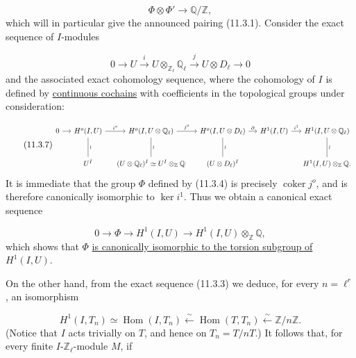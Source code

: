 \begin{equation}\tag{11.3.5}
\Phi\otimes\Phi'\longrightarrow\mathbb Q/\mathbb Z,
\end{equation}
which will in particular give the announced pairing (11.3.1). Consider
the exact sequence of $I$-modules

\begin{equation}\tag{11.3.6}
0\longrightarrow U\xrightarrow{\ i\ }
 U\otimes_{\mathbb Z_\ell}\mathbb Q_\ell
 \xrightarrow{\ j\ }U\otimes D_\ell\longrightarrow0
\end{equation}
and the associated exact cohomology sequence, where the cohomology of
$I$ is defined by \underline{continuous cochains} with coefficients in
the topological groups under consideration:

\begin{equation}\tag{11.3.7}
\resizebox{\textwidth}{!}{%
\begin{tikzcd}[ampersand replacement=\&, column sep=small, row sep=large]
0 \arrow[r]
 \& H^o(I,U) \arrow[r, "i^o"] \arrow[d, no head, "\wr"]
 \& H^o(I,U\otimes\mathbb Q_\ell) \arrow[r, "j^o"]
      \arrow[d, no head, "\wr"]
 \& H^o(I,U\otimes D_\ell) \arrow[r, "\partial"]
      \arrow[d, no head, "\wr"]
 \& H^1(I,U) \arrow[r, "i^1"]
 \& H^1(I,U\otimes\mathbb Q_\ell) \arrow[d, no head, "\wr"] \\
{}
 \& U^I
 \& (U\otimes\mathbb Q_\ell)^I\simeq U^I\otimes_{\mathbb Z}\mathbb Q
 \& (U\otimes D_\ell)^I
 \& {}
 \& H^1(I,U)\otimes_{\mathbb Z}\mathbb Q .
\end{tikzcd}}
\end{equation}
It is immediate that the group $\Phi$ defined by (11.3.4) is precisely
$\operatorname{coker}j^o$, and is therefore canonically isomorphic to
$\ker i^1$. Thus we obtain a canonical exact sequence

\begin{equation}\tag{11.3.8}
0\longrightarrow\Phi\longrightarrow H^1(I,U)
 \longrightarrow H^1(I,U)\otimes_{\mathbb Z}\mathbb Q,
\end{equation}
which shows that $\Phi$ \underline{is canonically isomorphic to the
torsion subgroup of $H^1(I,U)$}.

On the other hand, from the exact sequence (11.3.3) we deduce, for every
$n=\ell^r$, an isomorphism

\begin{equation}\tag{11.3.9}
H^1(I,T_n)\simeq\operatorname{Hom}(I,T_n)
 \xleftarrow{\sim}\operatorname{Hom}(T,T_n)
 \xleftarrow{\sim}\mathbb Z/n\mathbb Z.
\end{equation}
(Notice that $I$ acts trivially on $T$, and hence on $T_n=T/nT$.) It
follows that, for every finite $I$-$\mathbb Z_\ell$-module $M$, if

